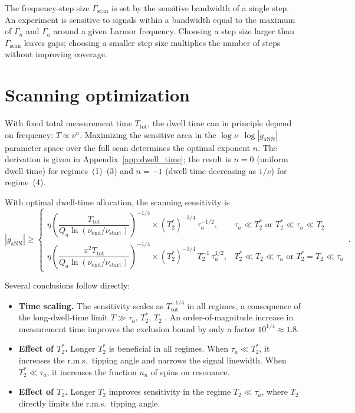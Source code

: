 The frequency-step size $\Gamma_{\mathrm{scan}}$ is set by the sensitive bandwidth of a single step. An experiment is sensitive to signals within a bandwidth equal to the maximum of $\Gamma_n$ and $\Gamma_a$ around a given Larmor frequency. Choosing a step size larger than $\Gamma_{\mathrm{scan}}$ leaves gaps; choosing a smaller step size multiplies the number of steps without improving coverage.

\section{Scanning optimization}\label{sec:experiment:optimization}

With fixed total measurement time $T_{\mathrm{tot}}$, the dwell time can in principle depend on frequency: $T \propto \nu^n$. Maximizing the sensitive area in the $\log\nu$--$\log|g_{\mathrm{aNN}}|$ parameter space over the full scan determines the optimal exponent $n$. The derivation is given in Appendix~\ref{app:dwell_time}; the result is $n=0$ (uniform dwell time) for regimes~(1)--(3) and $n=-1$ (dwell time decreasing as $1/\nu$) for regime~(4).

With optimal dwell-time allocation, the scanning sensitivity is
\begin{equation}
    |g_{\mathrm{aNN}}| \geqslant \left\{
    \begin{array}{ll}
    \eta
    \left(\dfrac{T_{\mathrm{tot}}}{Q_a\ln\!\left(\nu_{\mathrm{end}}/\nu_{\mathrm{start}} \right)}\right)^{-1/4}
     \times  (T_2^*)^{-3/4}\, \tau_a^{-1/2},
    & \tau_a\ll T_2^* \text{ or }  T_2^*\ll\tau_a\ll T_2 \\[10pt]
    \eta
    \left(\dfrac{\pi^2 T_{\mathrm{tot}}}{Q_a\ln\!\left(\nu_{\mathrm{end}}/\nu_{\mathrm{start}} \right)}\right)^{-1/4}
     \times  (T_2^*)^{-3/4}\, T_2^{-1}\, \tau_a^{1/2},
    & T_2^* \ll T_2 \ll \tau_a \text{ or } T_2^*=T_2 \ll \tau_a
    \end{array} \right.
    \,.\label{eq:gaNN_Ttot_optimal}
\end{equation}

Several conclusions follow directly:
\begin{itemize}
    \item \textbf{Time scaling.} The sensitivity scales as $T_{\mathrm{tot}}^{-1/4}$ in all regimes, a consequence of the long-dwell-time limit $T \gg \tau_a,\,T_2^*,\,T_2$ \cite{CASPErProposal2014,Aybas_2021_Quantum_sensitivity}. An order-of-magnitude increase in measurement time improves the exclusion bound by only a factor $10^{1/4}\approx1.8$.

    \item \textbf{Effect of $T_2^*$.} Longer $T_2^*$ is beneficial in all regimes. When $\tau_a \ll T_2^*$, it increases the r.m.s.\ tipping angle and narrows the signal linewidth. When $T_2^* \ll \tau_a$, it increases the fraction $u_n$ of spins on resonance.

    \item \textbf{Effect of $T_2$.} Longer $T_2$ improves sensitivity in the regime $T_2 \ll \tau_a$, where $T_2$ directly limits the r.m.s.\ tipping angle.
\end{itemize}

